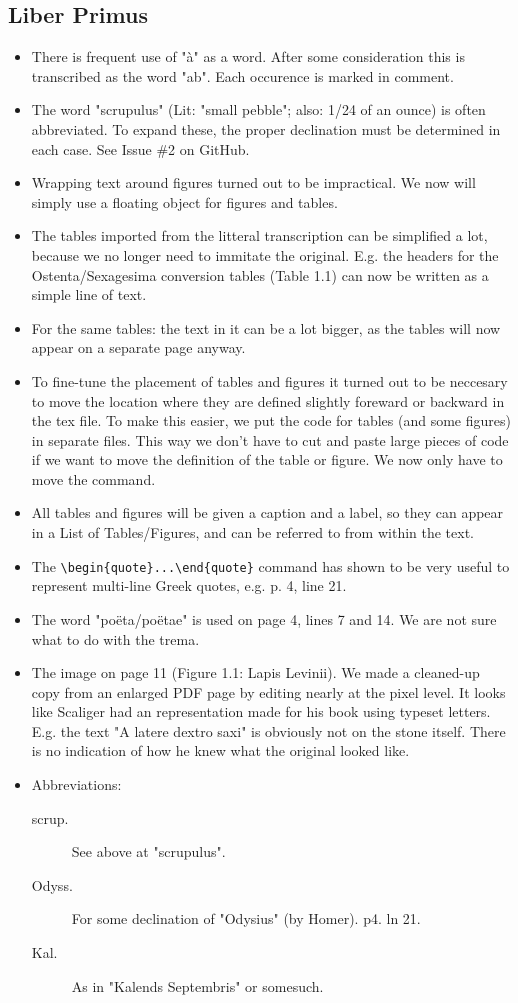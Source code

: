 \documentclass{report}
\begin{document}
\subsection{Liber Primus}
\begin{itemize}
\item
There is frequent use of "à" as a word. After some consideration this
is transcribed as the word "ab". Each occurence is marked in comment.
\item
The word "scrupulus" (Lit: "small pebble"; also: 1/24 of an ounce)
is often abbreviated. To expand these, the proper
declination must be determined in each case. See Issue \#2 on GitHub.
\item
Wrapping text around figures turned out to be impractical. We now will
simply use a floating object for figures and tables.
\item
The tables imported from the litteral transcription can be simplified
a lot, because we no longer need to immitate the original. E.g. the headers
for the Ostenta/Sexagesima conversion tables (Table 1.1) can now be written
as a simple line of text.
\item
For the same tables: the text in it can be a lot bigger, as the tables
will now appear on a separate page anyway.
\item
To fine-tune the placement of tables and figures it turned out to be
neccesary to move the location where they are defined slightly foreward or
backward in the tex file. To make this easier, we put the code for tables
 (and some figures) in separate files.
This way we don't have to cut and paste large pieces of code if we want to
move the definition of the table or figure. We now only have to move the
\verb++ command.
\item
All tables and figures will be given a caption and a label, so they can
appear in a List of Tables/Figures, and can be referred to from within the
text.
\item
The \verb+\begin{quote}...\end{quote}+ command has shown to be
very useful to represent multi-line Greek quotes, e.g. p. 4, line 21.
\item
The word "poëta/poëtae" is used on page 4, lines 7 and 14. We are not sure
what to do with the trema.
\item
The image on page 11 (Figure 1.1: Lapis Levinii). We made a cleaned-up copy
from an enlarged PDF page by editing nearly at the pixel level. It looks like
Scaliger had an representation made for his book using typeset letters.
E.g. the text "A latere dextro saxi" is obviously not on the stone itself.
There is no indication
of how he knew what the original looked like.
\item
Abbreviations:
\begin{description}
\item[scrup.]See above at "scrupulus".
\item[Odyss.]For some declination of "Odysius" (by Homer). p4. ln 21.
\item[Kal.]As in "Kalends Septembris" or somesuch.
\end{description}

\end{itemize}
\end{document}
